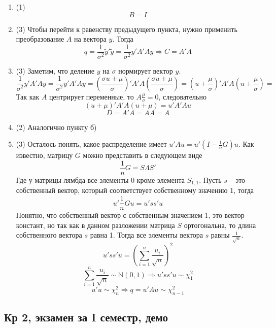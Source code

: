 \documentclass[12pt, a4paper]{article}\usepackage[]{graphicx}\usepackage[]{color}
\begin{document}
\begin{enumerate}
\begin{enumerate}
\item (1)
\[
B = I
\]
\item (3)
Чтобы перейти к равенству предыдущего пункта, нужно применить преобразование $A$ на вектора $y$. Тогда
\[
q = \frac{1}{\sigma^2}\tilde{y}' \tilde{y} =  \frac{1}{\sigma^2}y'A' A y \Rightarrow C = A' A
\]
\item (3)
Заметим, что деление $y$ на $\sigma$ нормирует вектор $y$.
\[
\frac{1}{\sigma^2}y'A' A y = \frac{1}{\sigma^2}y'A' A y = \left( \frac{\sigma u + \mu}{\sigma} \right)' A' A \left( \frac{\sigma u + \mu}{\sigma} \right) = (u + \frac{\mu}{\sigma})'A' A(u + \frac{\mu}{\sigma}) =
\]
Так как $A$ центрирует переменные, то $A\frac{\mu}{\sigma} = 0$, следовательно
\[
 (u + \mu)'A' A(u + \mu) = u'A'Au
\]
\[
D = A'A = AA = A
\]
\item (2)
Аналогично пункту б)
\item (3)
Осталось понять, какое распределение имеет $u'Au = u'(I - \frac{1}{n}G)u$. Как известно, матрицу $G$ можно представить в следующем виде
\[
\frac{1}{n}G = S\Lambda S'
\]
Где у матрицы лямбда все элементы 0 кроме элемента $S_{1,1}$. Пусть $s$ -- это собственный вектор, который соответствует собственному значению $1$, тогда
\[
u'\frac{1}{n}Gu = u'ss'u
\]
Понятно, что собственный вектор с собственным значением $1$, это вектор констант, но так как в данном разложении матрица $S$ ортогональна, то длина собственного вектора $s$ равна 1. Тогда все элементы вектора $s$ равны $\frac{1}{\sqrt{n}}$.
\[
 u'ss'u = \left( \sum_{i = 1}^n \frac{u_i}{\sqrt{n}} \right)^2
\]
\[
\sum_{i = 1}^n \frac{u_i}{\sqrt{n}} \sim \mathbb{N} (0,1) \Rightarrow  u'ss'u \sim \chi_{1}^2
\]
\[
u'u \sim \chi_{n}^2 \Rightarrow q = u'Au \sim \chi_{n-1}^2
\]
\end{enumerate}
\end{enumerate}


\subsection{Кр 2, экзамен за I семестр, демо}






\end{document}
